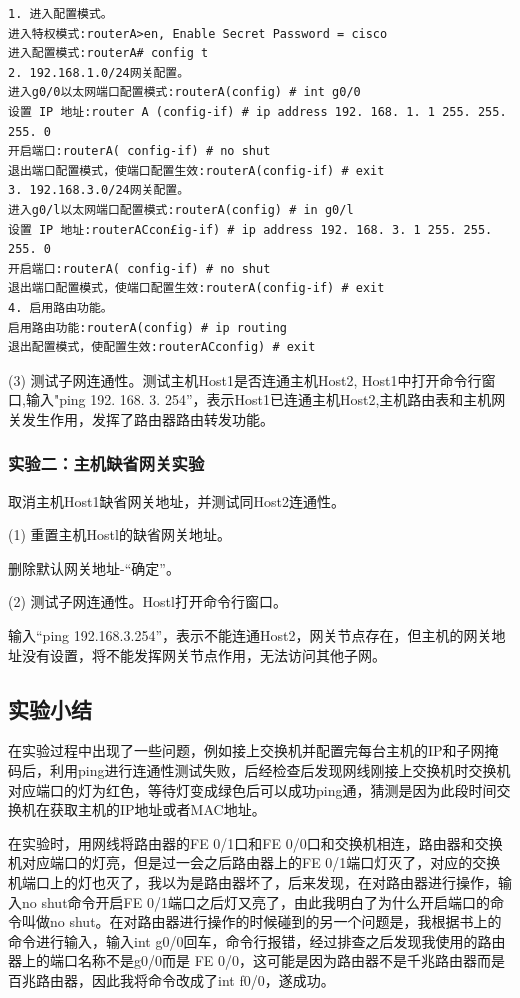 \documentclass[lang=cn,11pt,a4paper,cite=authoryear]{elegantpaper}
\begin{document}
\begin{lstlisting}
1. 进入配置模式。
进入特权模式:routerA>en, Enable Secret Password = cisco
进入配置模式:routerA# config t
2. 192.168.1.0/24网关配置。
进入g0/0以太网端口配置模式:routerA(config) # int g0/0
设置 IP 地址:router A (config-if) # ip address 192. 168. 1. 1 255. 255. 255. 0
开启端口:routerA( config-if) # no shut
退出端口配置模式，使端口配置生效:routerA(config-if) # exit
3. 192.168.3.0/24网关配置。
进入g0/l以太网端口配置模式:routerA(config) # in g0/l
设置 IP 地址:routerACcon£ig-if) # ip address 192. 168. 3. 1 255. 255. 255. 0
开启端口:routerA( config-if) # no shut
退出端口配置模式，使端口配置生效:routerA(config-if) # exit
4. 启用路由功能。
启用路由功能:routerA(config) # ip routing
退出配置模式，使配置生效:routerACconfig) # exit

\end{lstlisting}

(3)	测试子网连通性。测试主机Host1是否连通主机Host2, Host1中打开命令行窗口,输入"ping 192. 168. 3. 254”，表示Host1已连通主机Host2,主机路由表和主机网关发生作用，发挥了路由器路由转发功能。

\subsubsection{实验二：主机缺省网关实验}

取消主机Host1缺省网关地址，并测试同Host2连通性。

(1)	重置主机Hostl的缺省网关地址。

删除默认网关地址-“确定”。

(2)	测试子网连通性。Hostl打开命令行窗口。

输入“ping 192.168.3.254”，表示不能连通Host2，网关节点存在，但主机的网关地址没有设置，将不能发挥网关节点作用，无法访问其他子网。


\subsection{实验小结}

在实验过程中出现了一些问题，例如接上交换机并配置完每台主机的IP和子网掩码后，利用ping进行连通性测试失败，后经检查后发现网线刚接上交换机时交换机对应端口的灯为红色，等待灯变成绿色后可以成功ping通，猜测是因为此段时间交换机在获取主机的IP地址或者MAC地址。

在实验时，用网线将路由器的FE 0/1口和FE 0/0口和交换机相连，路由器和交换机对应端口的灯亮，但是过一会之后路由器上的FE 0/1端口灯灭了，对应的交换机端口上的灯也灭了，我以为是路由器坏了，后来发现，在对路由器进行操作，输入no shut命令开启FE 0/1端口之后灯又亮了，由此我明白了为什么开启端口的命令叫做no shut。在对路由器进行操作的时候碰到的另一个问题是，我根据书上的命令进行输入，输入int g0/0回车，命令行报错，经过排查之后发现我使用的路由器上的端口名称不是g0/0而是 FE 0/0，这可能是因为路由器不是千兆路由器而是百兆路由器，因此我将命令改成了int f0/0，遂成功。
\end{document}
